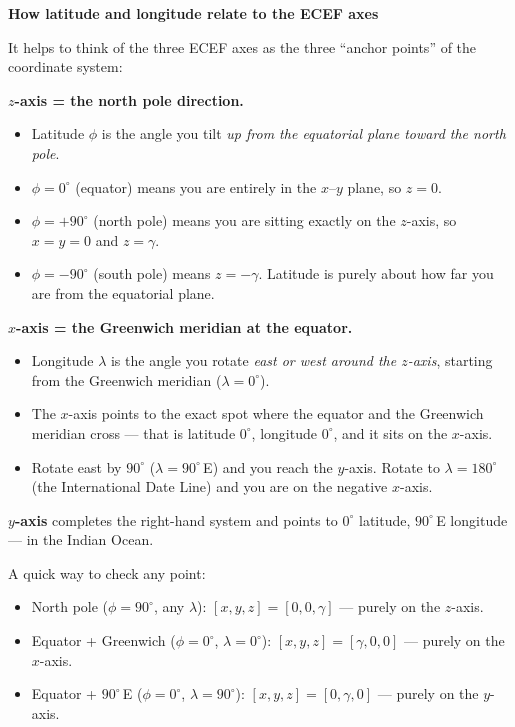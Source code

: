 \documentclass[12pt, a4paper]{article}
\begin{document}
\begin{notebox}
  \textbf{How latitude and longitude relate to the ECEF axes}

  It helps to think of the three ECEF axes as the three ``anchor
  points'' of the coordinate system:

  \textbf{$z$-axis = the north pole direction.}
  \begin{itemize}
    \item Latitude $\phi$ is the angle you tilt \emph{up from the equatorial
  plane toward the north pole}.
  \item $\phi = 0^\circ$ (equator) means you are entirely in the $x$--$y$
  plane, so $z=0$.
  \item  $\phi = +90^\circ$ (north pole) means you are sitting exactly on the
  $z$-axis, so $x=y=0$ and $z=\gamma$.
  \item $\phi = -90^\circ$ (south pole) means $z=-\gamma$.
  Latitude is purely about how far you are from the equatorial plane.
  \end{itemize}
  
  
 
  

  \textbf{$x$-axis = the Greenwich meridian at the equator.}
  \begin{itemize}
    \item Longitude $\lambda$ is the angle you rotate \emph{east or west
  around the $z$-axis}, starting from the Greenwich meridian
  ($\lambda=0^\circ$).
  \item The $x$-axis points to the exact spot where the equator and the
  Greenwich meridian cross --- that is latitude $0^\circ$, longitude
  $0^\circ$, and it sits on the $x$-axis.
  \item  Rotate east by $90^\circ$ ($\lambda=90^\circ$\,E) and you reach the
  $y$-axis.
  Rotate to $\lambda=180^\circ$ (the International Date Line) and you
  are on the negative $x$-axis.
  \end{itemize}
  
  \textbf{$y$-axis} completes the right-hand system and points to
  $0^\circ$ latitude, $90^\circ$\,E longitude --- in the Indian Ocean.

  \medskip
  A quick way to check any point:
  \begin{itemize}[leftmargin=1.2em,itemsep=2pt]
    \item North pole ($\phi=90^\circ$, any $\lambda$):
      $[x,y,z] = [0, 0, \gamma]$ --- purely on the $z$-axis.
    \item Equator + Greenwich ($\phi=0^\circ$, $\lambda=0^\circ$):
      $[x,y,z] = [\gamma, 0, 0]$ --- purely on the $x$-axis.
    \item Equator + $90^\circ$\,E ($\phi=0^\circ$, $\lambda=90^\circ$):
      $[x,y,z] = [0, \gamma, 0]$ --- purely on the $y$-axis.
  \end{itemize}
\end{notebox}
\end{document}
